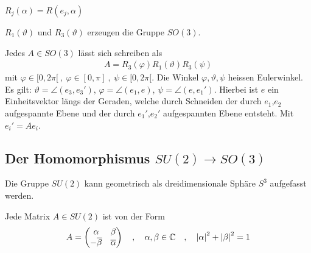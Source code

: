 \begin{definition}
    $R_j(\alpha) = R(e_j , \alpha)$
\end{definition}

\begin{satz}
    $R_1(\vartheta)$ und $R_3(\vartheta)$ erzeugen die Gruppe $SO(3)$.
\end{satz}

\begin{satz}
    Jedes $A \in SO(3)$ lässt sich schreiben als
    \begin{align*}
        A = R_3 (\varphi) R_1 (\vartheta) R_3 (\psi)
    \end{align*}
    mit $\varphi \in [0,2 \pi[ \ , \ \varphi \in [0,\pi] \ , \ \psi \in
    [0,2 \pi[$. Die Winkel $\varphi,\vartheta,\psi$ heissen Eulerwinkel.
    Es gilt: $\vartheta = \angle (e_3,e_3')$, $\varphi = \angle(e_1,e)$,
    $\psi = \angle (e,e_1')$. Hierbei ist $e$ ein Einheitsvektor längs der
    Geraden, welche durch Schneiden der durch $e_1$,$e_2$ aufgespannte Ebene
    und der durch $e_1'$,$e_2'$ aufgespannten Ebene entsteht. Mit $e_i' =
    A e_i$.
\end{satz}

\subsection{Der Homomorphismus $SU(2) \rightarrow SO(3)$}\label{Hom_SU2_SO3}

Die Gruppe $SU(2)$ kann geometrisch als dreidimensionale Sphäre $S^3$ aufgefasst
werden.

\begin{lemma}
    Jede Matrix $A \in SU(2)$ ist von der Form
    \begin{align*}
        A = \begin{pmatrix}
            \alpha & \beta \\ - \overline{\beta} & \overline{\alpha}
        \end{pmatrix}
        \hspace{10pt} , \hspace{10pt}
        \alpha,\beta \in \mathbb{C}
        \hspace{10pt} , \hspace{10pt}
        \left\vert \alpha \right\vert^2 + \left\vert \beta \right\vert^2 = 1
    \end{align*}
\end{lemma}

